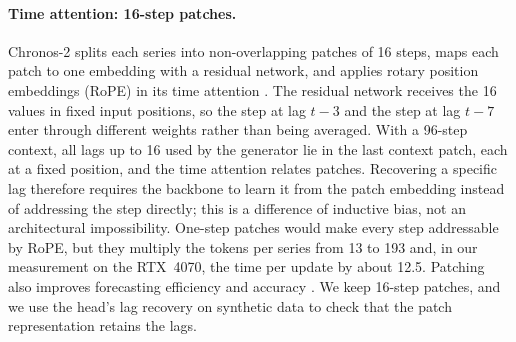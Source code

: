 \paragraph{Time attention: 16-step patches.}
Chronos-2 splits each series into non-overlapping patches of 16 steps, maps
each patch to one embedding with a residual network, and applies rotary
position embeddings (RoPE) in its time attention
\citep[p.~5]{ansari2025chronos2}. The residual network receives the 16 values
in fixed input positions, so the step at lag $t-3$ and the step at lag $t-7$
enter through different weights rather than being averaged. With a 96-step
context, all lags up to 16 used by the generator lie in the last context patch,
each at a fixed position, and the time attention relates patches. Recovering a
specific lag therefore requires the backbone to learn it from the patch
embedding instead of addressing the step directly; this is a difference of
inductive bias, not an architectural impossibility. One-step patches would make
every step addressable by RoPE, but they multiply the tokens per series from
13 to 193 and, in our measurement on the RTX~4070, the time per update by about
12.5. Patching also improves forecasting efficiency and accuracy
\citep{nie2023patchtst}. We keep 16-step patches, and we use the head's lag
recovery on synthetic data to check that the patch representation retains the
lags.

